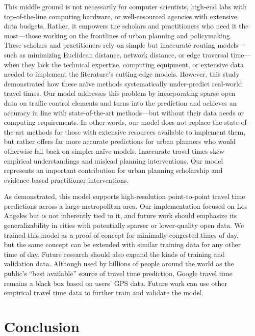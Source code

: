 \documentclass[12pt,letterpaper]{article} %
\begin{document}
This middle ground is not necessarily for computer scientists, high-end labs with top-of-the-line computing hardware, or well-resourced agencies with extensive data budgets. Rather, it empowers the scholars and practitioners who need it the most---those working on the frontlines of urban planning and policymaking. These scholars and practitioners rely on simple but inaccurate routing models---such as minimizing Euclidean distance, network distance, or edge traversal time---when they lack the technical expertise, computing equipment, or extensive data needed to implement the literature's cutting-edge models. However, this study demonstrated how these naïve methods systematically under-predict real-world travel times. Our model addresses this problem by incorporating sparse open data on traffic control elements and turns into the prediction and achieves an accuracy in line with state-of-the-art methods---but without their data needs or computing requirements. In other words, our model does not replace the state-of-the-art methods for those with extensive resources available to implement them, but rather offers far more accurate predictions for urban planners who would otherwise fall back on simpler naïve models. Inaccurate travel times skew empirical understandings and mislead planning interventions. Our model represents an important contribution for urban planning scholarship and evidence-based practitioner interventions.

As demonstrated, this model supports high-resolution point-to-point travel time predictions across a large metropolitan area. Our implementation focused on Los Angeles but is not inherently tied to it, and future work should emphasize its generalizability in cities with potentially sparser or lower-quality open data. We trained this model as a proof-of-concept for minimally-congested times of day, but the same concept can be extended with similar training data for any other time of day. Future research should also expand the kinds of training and validation data. Although used by billions of people around the world as the public's \enquote{best available} source of travel time prediction, Google travel time remains a black box based on users' GPS data. Future work can use other empirical travel time data to further train and validate the model.

\section{Conclusion}
\end{document}
